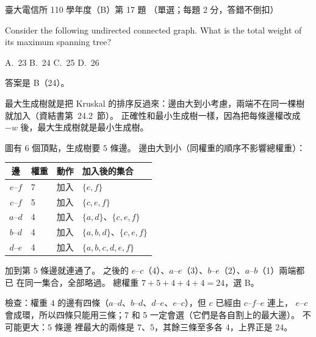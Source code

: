 \begin{pastexam}[label={px:ntu-110-comm-dsa-17}]{臺大電信所 110 學年度（B）第 17 題}
（單選；每題 2 分，答錯不倒扣）

Consider the following undirected connected graph. What is the total weight of its maximum spanning tree?

\begin{center}
\end{center}

A.~23 \qquad B.~24 \qquad C.~25 \qquad D.~26
\end{pastexam}

\begin{pastsoln}
答案是 B（24）。

最大生成樹就是把 Kruskal 的排序反過來：邊由大到小考慮，兩端不在同一棵樹就加入（資結書第~24.2~節）。
正確性和最小生成樹一樣，因為把每條邊權改成 $-w$ 後，最大生成樹就是最小生成樹。

圖有 $6$ 個頂點，生成樹要 $5$ 條邊。 邊由大到小（同權重的順序不影響總權重）：
\begin{center}
\begin{tabular}{clll}
\toprule
邊 & 權重 & 動作 & 加入後的集合 \\
\midrule
$e$--$f$ & 7 & 加入 & $\{e, f\}$ \\
$c$--$f$ & 5 & 加入 & $\{c, e, f\}$ \\
$a$--$d$ & 4 & 加入 & $\{a, d\}$、$\{c, e, f\}$ \\
$b$--$d$ & 4 & 加入 & $\{a, b, d\}$、$\{c, e, f\}$ \\
$d$--$e$ & 4 & 加入 & $\{a, b, c, d, e, f\}$ \\
\bottomrule
\end{tabular}
\end{center}
加到第 $5$ 條邊就連通了。 之後的 $e$--$c$（4）、$a$--$e$（3）、$b$--$e$（2）、$a$--$b$（1）兩端都已
在同一集合，全部略過。 總權重 $7 + 5 + 4 + 4 + 4 = 24$，選 B。

檢查：權重 $4$ 的邊有四條（$a$--$d$、$b$--$d$、$d$--$e$、$e$--$c$），但 $c$ 已經由 $c$--$f$--$e$ 連上，
$e$--$c$ 會成環，所以四條只能用三條；7 和 5 一定會選（它們是各自割上的最大邊）。 不可能更大：$5$ 條邊
裡最大的兩條是 $7$、$5$，其餘三條至多各 $4$，上界正是 $24$。
\end{pastsoln}
